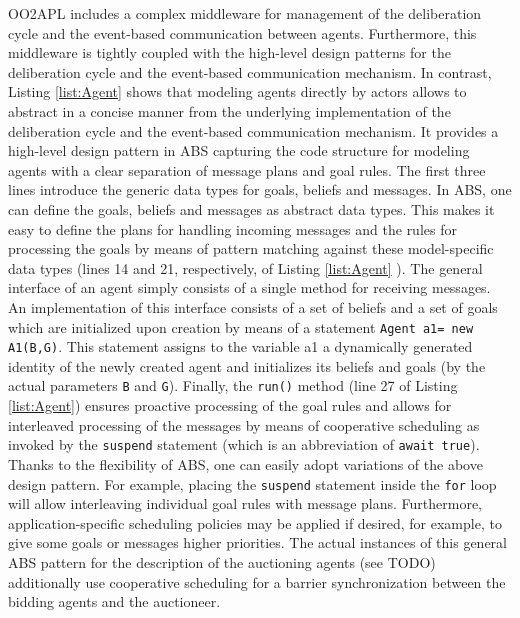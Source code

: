 OO2APL  includes a complex middleware for management of the deliberation cycle and the event-based communication between agents. 
Furthermore, this middleware is tightly coupled with the high-level design patterns for the deliberation cycle and  the event-based communication mechanism.
In contrast,  Listing \ref{list:Agent} shows that modeling agents directly by actors  allows to abstract in a concise manner from the underlying implementation of the deliberation cycle  and the event-based communication mechanism.
It provides  a high-level design pattern in ABS capturing the code structure for modeling agents with a clear separation of message plans and goal rules. 
The first three lines introduce the generic data types for goals, beliefs and messages.
In ABS, one can define the goals, beliefs and messages as abstract data types.
This makes it easy to define the plans for  handling incoming messages and the rules for processing the goals by means of pattern matching against these model-specific data types (lines 14 and 21, respectively, of Listing \ref{list:Agent} ).
The general interface of an agent simply consists of a single method for receiving  messages. An  implementation of this interface consists of a set of beliefs and a set of goals which are initialized upon creation by means of a statement
\lstinline|Agent a1= new A1(B,G)|.
This statement  assigns to the variable a1 a dynamically generated  identity of the newly created agent and initializes its beliefs and goals (by  the actual parameters \lstinline|B| and \lstinline|G|).
Finally,  the \lstinline|run()| method (line 27 of  Listing \ref{list:Agent}) ensures proactive processing of the goal rules and allows for
interleaved processing of the messages by means of cooperative scheduling as invoked by the \lstinline|suspend| statement (which is an abbreviation of \lstinline|await true|).
Thanks to the flexibility of ABS, one can easily adopt variations of the above design pattern.
For example, placing the \lstinline|suspend| statement inside the \lstinline|for| loop will allow interleaving individual goal rules with message plans.
Furthermore, application-specific scheduling policies \cite{rabs,cog}  may be applied if desired, for example, to give some goals or messages higher priorities.
The actual  instances of  this general  ABS pattern for the description of the auctioning agents
(see  TODO)
additionally use cooperative scheduling for a barrier synchronization between the bidding agents
and the auctioneer. 



